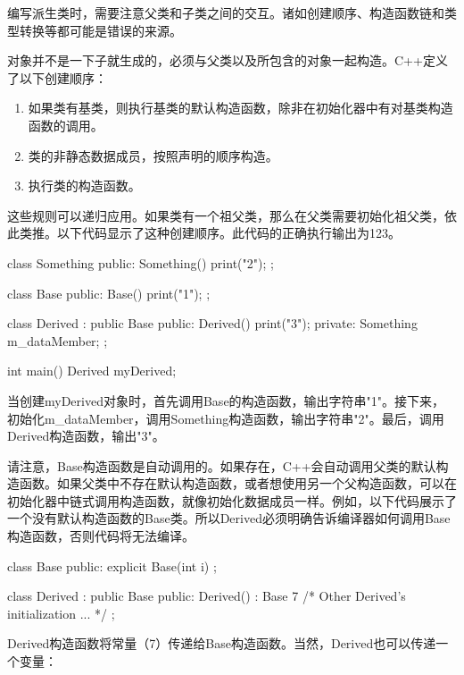 
编写派生类时，需要注意父类和子类之间的交互。诸如创建顺序、构造函数链和类型转换等都可能是错误的来源。


对象并不是一下子就生成的，必须与父类以及所包含的对象一起构造。C++定义了以下创建顺序：

\begin{enumerate}
\item
如果类有基类，则执行基类的默认构造函数，除非在初始化器中有对基类构造函数的调用。

\item
类的非静态数据成员，按照声明的顺序构造。

\item
执行类的构造函数。
\end{enumerate}

这些规则可以递归应用。如果类有一个祖父类，那么在父类需要初始化祖父类，依此类推。以下代码显示了这种创建顺序。此代码的正确执行输出为123。

\begin{cpp}
class Something
{
    public:
        Something() { print("2"); }
};

class Base
{
    public:
        Base() { print("1"); }
};

class Derived : public Base
{
    public:
        Derived() { print("3"); }
    private:
        Something m_dataMember;
};

int main()
{
    Derived myDerived;
}
\end{cpp}

当创建myDerived对象时，首先调用Base的构造函数，输出字符串"1"。接下来，初始化m\_dataMember，调用Something构造函数，输出字符串"2"。最后，调用Derived构造函数，输出"3"。

请注意，Base构造函数是自动调用的。如果存在，C++会自动调用父类的默认构造函数。如果父类中不存在默认构造函数，或者想使用另一个父构造函数，可以在初始化器中链式调用构造函数，就像初始化数据成员一样。例如，以下代码展示了一个没有默认构造函数的Base类。所以Derived必须明确告诉编译器如何调用Base构造函数，否则代码将无法编译。

\begin{cpp}
class Base
{
    public:
        explicit Base(int i) {}
};

class Derived : public Base
{
    public:
        Derived() : Base { 7 } { /* Other Derived's initialization ... */ }
};
\end{cpp}

Derived构造函数将常量（7）传递给Base构造函数。当然，Derived也可以传递一个变量：

